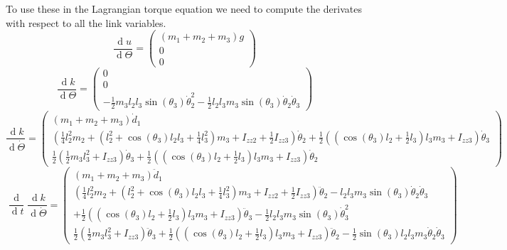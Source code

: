 \documentclass[10pt,a4paper]{article}
\DeclareMathOperator{\diff}{\text{d}}
\begin{document}
To use these in the Lagrangian torque equation we need to compute the derivates with respect to all the link variables.
\begin{equation*}
  \frac{\diff u}{\diff \Theta} = \begin{pmatrix}
    (m_{1} + m_{2} + m_{3})g\\
    0\\
    0
  \end{pmatrix}
\end{equation*}
\begin{equation*}
  \frac{\diff k}{\diff \Theta} = \begin{pmatrix}
    0\\
    0\\
    -\frac{1}{2}m_{3}l_{2}l_{3}\sin(\theta_{3})\dot{\theta}_{2}^{2} - \frac{1}{2}l_{2}l_{3}m_{3}\sin(\theta_{3})\dot{\theta}_{2}\dot{\theta}_{3}
  \end{pmatrix}
\end{equation*}
\begin{equation*}
  \frac{\diff k}{\diff \dot{\Theta}} = \begin{pmatrix}
    (m_{1} + m_{2} + m_{3})\dot{d}_{1}\\
    \left( \frac{1}{4}l_{2}^{2}m_{2} + \left( l_{2}^{2} + \cos(\theta_{3})l_{2}l_{3} + \frac{1}{4}l_{3}^{2} \right)m_{3} + I_{zz2} + \frac{1}{2}I_{zz3} \right)\dot{\theta}_{2} + \frac{1}{2}\left( \left( \cos(\theta_{3})l_{2} + \frac{1}{2}l_{3} \right)l_{3}m_{3} + I_{zz3} \right)\dot{\theta}_{3}\\
    \frac{1}{2}\left( \frac{1}{2}m_{3}l_{3}^{2} + I_{zz3} \right)\dot{\theta}_{3} + \frac{1}{2}\left( \left( \cos(\theta_{3})l_{2} + \frac{1}{2}l_{3} \right)l_{3}m_{3} + I_{zz3} \right)\dot{\theta}_{2}
  \end{pmatrix}
\end{equation*}
\begin{equation*}
  \frac{\diff}{\diff t}\frac{\diff k}{\diff \dot{\Theta}} = \begin{pmatrix}
    (m_{1} + m_{2} + m_{3})\ddot{d}_{1}\\
    \left( \frac{1}{4}l_{2}^{2}m_{2} + \left( l_{2}^{2} + \cos(\theta_{3})l_{2}l_{3} + \frac{1}{4}l_{3}^{2} \right)m_{3} + I_{zz2} + \frac{1}{2}I_{zz3} \right)\ddot{\theta}_{2} - l_{2}l_{3}m_{3}\sin(\theta_{3})\dot{\theta}_{2}\dot{\theta}_{3}\\
    + \frac{1}{2}\left( \left( \cos(\theta_{3})l_{2} + \frac{1}{2}l_{3} \right)l_{3}m_{3} + I_{zz3} \right)\ddot{\theta}_{3} - \frac{1}{2}l_{2}l_{3}m_{3}\sin(\theta_{3})\dot{\theta}_{3}^{2}\\
    \frac{1}{2}\left( \frac{1}{2}m_{3}l_{3}^{2} + I_{zz3} \right)\ddot{\theta}_{3} + \frac{1}{2}\left( \left( \cos(\theta_{3})l_{2} + \frac{1}{2}l_{3} \right)l_{3}m_{3} + I_{zz3} \right)\ddot{\theta}_{2} - \frac{1}{2}\sin(\theta_{3})l_{2}l_{3}m_{3}\dot{\theta}_{2}\dot{\theta}_{3}
  \end{pmatrix}
\end{equation*}
\end{document}
